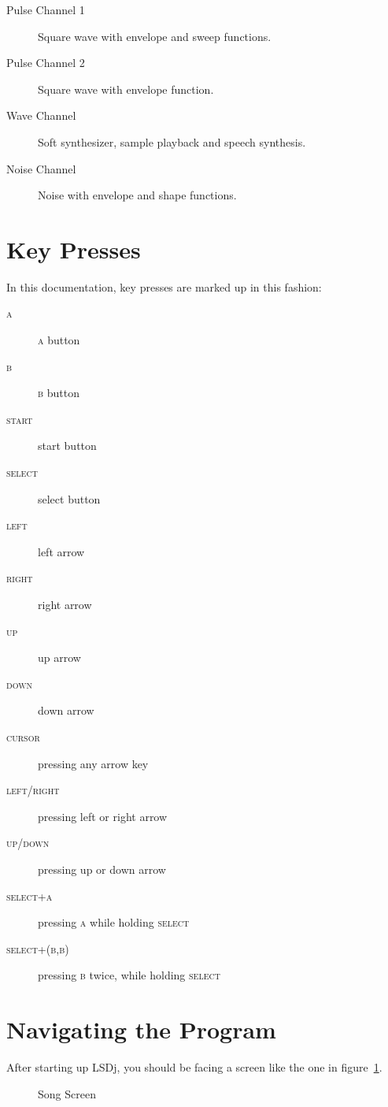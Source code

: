 \begin{description}
\item[Pulse Channel 1] Square wave with envelope and sweep functions.
\item[Pulse Channel 2] Square wave with envelope function.
\item[Wave Channel] Soft synthesizer, sample playback and speech synthesis.
\item[Noise Channel] Noise with envelope and shape functions.
\end{description}


\section{Key Presses}
In this documentation, key presses are marked up in this fashion:
\begin{description}
\item[\textsc{a}] \textsc{a} button
\item[\textsc{b}] \textsc{b} button
\item[\textsc{start}] start button
\item[\textsc{select}] select button
\item[\textsc{left}] left arrow
\item[\textsc{right}] right arrow
\item[\textsc{up}] up arrow
\item[\textsc{down}] down arrow
\item[\textsc{cursor}] pressing any arrow key
\item[\textsc{left/right}] pressing left or right arrow
\item[\textsc{up/down}] pressing up or down arrow
\item[\textsc{select+a}] pressing \textsc{a} while holding \textsc{select}
\item[\textsc{select+(b,b)}] pressing \textsc{b} twice, while holding \textsc{select}
\end{description}

\section{Navigating the Program}
After starting up LSDj, you should be facing a screen like the one in figure~\ref{fig:song}.

\begin{figure}[hbtp]
\centering
{}
\caption{Song Screen}
\label{fig:song}
\end{figure}

